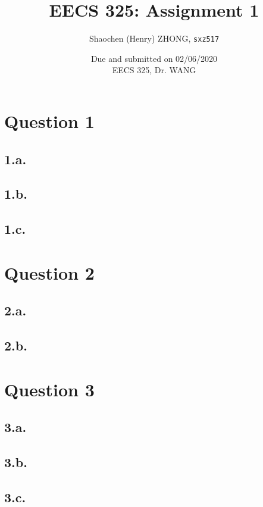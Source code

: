\documentclass[12pt]{article}
\newcommand{\inlinecode}{\texttt}
\begin{document}
\title{\textbf{EECS 325: Assignment 1}}

\author{Shaochen (Henry) ZHONG, \inlinecode{sxz517} }
\date{Due and submitted on 02/06/2020 \\ EECS 325, Dr. WANG}
\maketitle

\section{Question 1}

\subsection{1.a.}
\subsection{1.b.}
\subsection{1.c.}

\section{Question 2}

\subsection{2.a.}
\subsection{2.b.}


\section{Question 3}

\subsection{3.a.}
\subsection{3.b.}
\subsection{3.c.}
\end{document}
